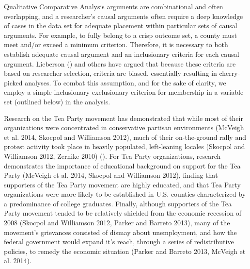 \documentclass[]{article}
\begin{document}
Qualitative Comparative Analysis arguments are combinational and often overlapping, and a researcher's causal arguments often require a deep knowledge of cases in the data set for adequate placement within particular sets of causal arguments. For example, to fully belong to a crisp outcome set, a county must meet and/or exceed a minimum criterion. Therefore, it is necessary to both establish adequate causal argument and an inclusionary criteria for each causal argument. Lieberson () and others have argued that because these criteria are based on researcher selection, criteria are biased, essentially resulting in cherry-picked analyses. To combat this assumption, and for the sake of clarity, we employ a simple inclusionary-exclusionary criterion for membership in a variable set (outlined below) in the analysis. 

Research on the Tea Party movement has demonstrated that while most of their organizations were concentrated in conservative partisan environments (McVeigh et al. 2014, Skocpol and Williamson 2012), much of their on-the-ground rally and protest activity took place in heavily populated, left-leaning locales (Skocpol and Williamson 2012, Zernike 2010) (). For Tea Party organizations, research demonstrates the importance of educational background on support for the Tea Party (McVeigh et al. 2014, Skocpol and Williamson 2012), finding that supporters of the Tea Party movement are highly educated, and that Tea Party organizations were more likely to be established in U.S. counties characterized by a predominance of college graduates. Finally, although supporters of the Tea Party movement tended to be relatively shielded from the economic recession of 2008 (Skocpol and Williamson 2012, Parker and Barreto 2013), many of the movement's grievances consisted of dismay about unemployment, and how the federal government would expand it's reach, through a series of redistributive policies, to remedy the economic situation (Parker and Barreto 2013, McVeigh et al. 2014). 
\end{document}
